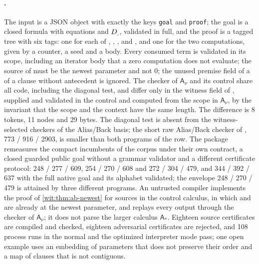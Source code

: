\paragraph{.}
The input is a JSON object with exactly the keys \texttt{goal} and
\texttt{proof}; the goal is a closed formula with equations and $D_{,}$,
validated in full, and the proof is a tagged tree with six tags: one for
each of , , , 
and , and one for the two computations, given by a counter,
a seed and a body.  Every consumed term is validated in
its scope, including an iterator body that a zero computation does not
evaluate; the source of  must be the newest parameter and
not $0$; the unused premise field of a  of a clause without
antecedent is ignored.  The checker of $\mathsf{A}_{\nu}$ and its control
share all code, including the diagonal test, and differ only in the
witness field of , supplied and validated in the control
and computed from the scope in $\mathsf{A}_{\nu}$, by the invariant that
the scope and the context have the same length.  The difference is 8
tokens, 11 nodes and 29 bytes.  The diagonal test is absent from the
witness-selected checkers of the Alias/Back basis; the short raw Alias/Back
checker of , 773 / 916 / 2903, is smaller than both
programs of the row.  The package remeasures the compact incumbents of the
corpus under their own contract, a closed guarded public goal without a
grammar validator and a different certificate protocol: 248 / 277 / 609,
254 / 270 / 608 and 272 / 304 / 479, and 344 / 392 / 637 with the full
native goal and its alphabet validated; the envelope 248 / 270 / 479 is
attained by three different programs.  An untrusted compiler implements
the proof of \cref{wit:thm:ab-newest} for sources in the control calculus,
in which  and  are already at the newest
parameter, and replays every output through the checker of
$\mathsf{A}_{\nu}$; it does not parse the larger calculus
$\mathsf{A}_{\ast}$.  Eighteen source certificates are compiled and
checked, eighteen adversarial certificates are rejected, and 108 process
runs in the normal and the optimized interpreter mode pass; one open
example uses an embedding of parameters that does not preserve their order
and a map of clauses that is not contiguous.

